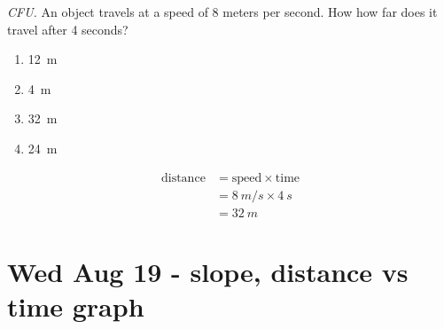\documentclass[14pt,t,]{beamer}
\begin{document}
\begin{frame}
\textit{CFU.} An object travels at a speed of 8 meters per second. How how far does it travel after 4 seconds?
\vspace{1ex}

\pause

\begin{enumerate}[A]
    \item \SI{12}{m}
    \item \SI{4}{m}
    \item \alert<2->{\SI{32}{m}}
    \item \SI{24}{m}
\end{enumerate}

\pause


\vspace{-1cm}

\begin{align*}
    \mathrm{distance} &= \mathrm{speed} \times \mathrm{time} \\[1ex]
    &= \SI{8}{m/s} \times \SI{4}{s} \\[1ex]
    &= \boxed{\SI{32}{m}}
\end{align*}

\end{frame}

\section{Wed Aug 19 - slope, distance vs time graph}
\end{document}
